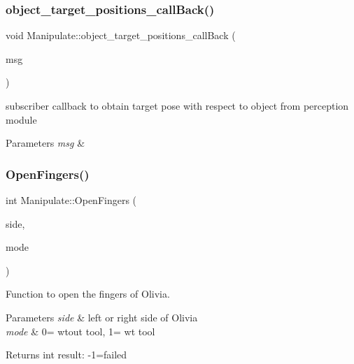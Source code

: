 \subsubsection{\texorpdfstring{object\+\_\+target\+\_\+positions\+\_\+call\+Back()}{object\_target\_positions\_callBack()}}
{\footnotesize\ttfamily void Manipulate\+::object\+\_\+target\+\_\+positions\+\_\+call\+Back (\begin{DoxyParamCaption}\item[{const geometry\+\_\+msgs\+::\+Pose\+Array\+::\+Ptr \&}]{msg }\end{DoxyParamCaption})\hspace{0.3cm}{\ttfamily [private]}}



subscriber callback to obtain target pose with respect to object from perception module 


\begin{DoxyParams}{Parameters}
{\em msg} & \\
\hline
\end{DoxyParams}
\mbox{\label{structManipulate_a9773bc419a59c54669e7ace7b1c71860}} 
\subsubsection{\texorpdfstring{Open\+Fingers()}{OpenFingers()}}
{\footnotesize\ttfamily int Manipulate\+::\+Open\+Fingers (\begin{DoxyParamCaption}\item[{std\+::string}]{side,  }\item[{int}]{mode }\end{DoxyParamCaption})\hspace{0.3cm}{\ttfamily [private]}}



Function to open the fingers of Olivia. 


\begin{DoxyParams}{Parameters}
{\em side} & left or right side of Olivia \\
\hline
{\em mode} & 0= wtout tool, 1= wt tool \\
\hline
\end{DoxyParams}
\begin{DoxyReturn}{Returns}
int result\+: -\/1=failed 
\end{DoxyReturn}
\mbox{\label{structManipulate_ae182e793c8a517ba6ff8c2f627dffa43}} 

